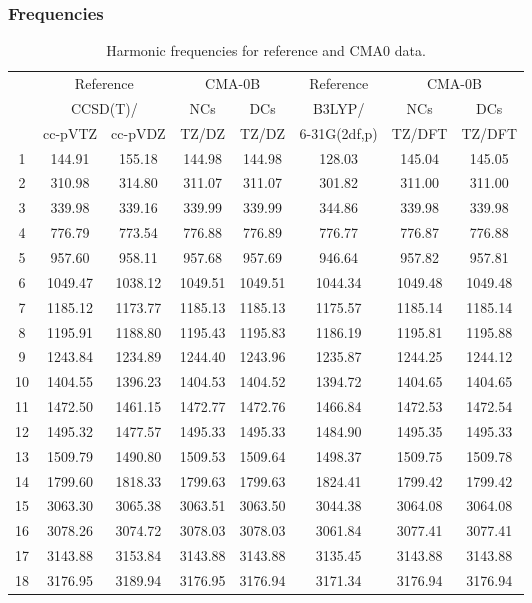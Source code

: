 \documentclass[10pt,oneside]{article}
\begin{document}
\subsubsection*{Frequencies}
\begin{table}[h!]
\centering
\caption{Harmonic frequencies for reference and CMA0 data.}
\begin{tabular}{cccccccc}
\toprule
{} & \multicolumn{2}{c}{Reference} & \multicolumn{2}{c}{CMA-0B} &    Reference & \multicolumn{2}{c}{CMA-0B} \\
{} & \multicolumn{2}{c}{CCSD(T)/} &     NCs &     DCs &       B3LYP/ &     NCs &     DCs \\
{} &   cc-pVTZ & cc-pVDZ &   TZ/DZ &   TZ/DZ & 6-31G(2df,p) &  TZ/DFT &  TZ/DFT \\
\midrule
1  &    144.91 &  155.18 &  144.98 &  144.98 &       128.03 &  145.04 &  145.05 \\
2  &    310.98 &  314.80 &  311.07 &  311.07 &       301.82 &  311.00 &  311.00 \\
3  &    339.98 &  339.16 &  339.99 &  339.99 &       344.86 &  339.98 &  339.98 \\
4  &    776.79 &  773.54 &  776.88 &  776.89 &       776.77 &  776.87 &  776.88 \\
5  &    957.60 &  958.11 &  957.68 &  957.69 &       946.64 &  957.82 &  957.81 \\
6  &   1049.47 & 1038.12 & 1049.51 & 1049.51 &      1044.34 & 1049.48 & 1049.48 \\
7  &   1185.12 & 1173.77 & 1185.13 & 1185.13 &      1175.57 & 1185.14 & 1185.14 \\
8  &   1195.91 & 1188.80 & 1195.43 & 1195.83 &      1186.19 & 1195.81 & 1195.88 \\
9  &   1243.84 & 1234.89 & 1244.40 & 1243.96 &      1235.87 & 1244.25 & 1244.12 \\
10 &   1404.55 & 1396.23 & 1404.53 & 1404.52 &      1394.72 & 1404.65 & 1404.65 \\
11 &   1472.50 & 1461.15 & 1472.77 & 1472.76 &      1466.84 & 1472.53 & 1472.54 \\
12 &   1495.32 & 1477.57 & 1495.33 & 1495.33 &      1484.90 & 1495.35 & 1495.33 \\
13 &   1509.79 & 1490.80 & 1509.53 & 1509.64 &      1498.37 & 1509.75 & 1509.78 \\
14 &   1799.60 & 1818.33 & 1799.63 & 1799.63 &      1824.41 & 1799.42 & 1799.42 \\
15 &   3063.30 & 3065.38 & 3063.51 & 3063.50 &      3044.38 & 3064.08 & 3064.08 \\
16 &   3078.26 & 3074.72 & 3078.03 & 3078.03 &      3061.84 & 3077.41 & 3077.41 \\
17 &   3143.88 & 3153.84 & 3143.88 & 3143.88 &      3135.45 & 3143.88 & 3143.88 \\
18 &   3176.95 & 3189.94 & 3176.95 & 3176.94 &      3171.34 & 3176.94 & 3176.94 \\
\bottomrule
\end{tabular}
\end{table}
\end{document}
